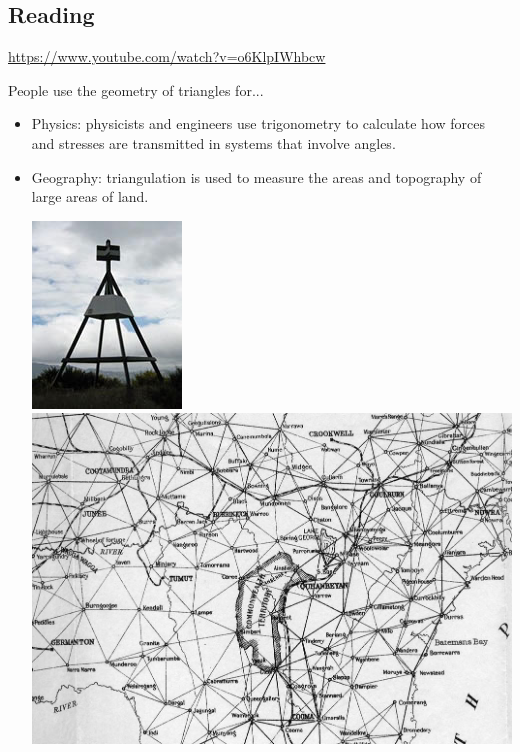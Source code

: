 



\subsection*{Reading}
\begin{center}
\begin{tcolorbox}[width=0.8\textwidth,colback={white},title={\textbf{Go and watch...}},colbacktitle=black,coltitle=white]
  \textcolor{black}{\url{https://www.youtube.com/watch?v=o6KlpIWhbcw}}
\end{tcolorbox}
\end{center}

\begin{center}
\begin{tcolorbox}[width=0.8\textwidth,colback={white},title={\textbf{What's it good for?}},colbacktitle=MidnightBlue,coltitle=white]
  People use the geometry of triangles for...
  \begin{itemize}
    \item Physics: physicists and engineers use trigonometry to calculate how forces and stresses are transmitted in systems that involve angles.
    \item Geography: triangulation is used to measure the areas and topography of large areas of land.
      \begin{center}
        \includegraphics[height=0.4\textwidth]{trig-station}\thinspace%
        \includegraphics[height=0.4\textwidth]{trigmap}

\end{center}
\end{itemize}
\end{tcolorbox}
\end{center}
